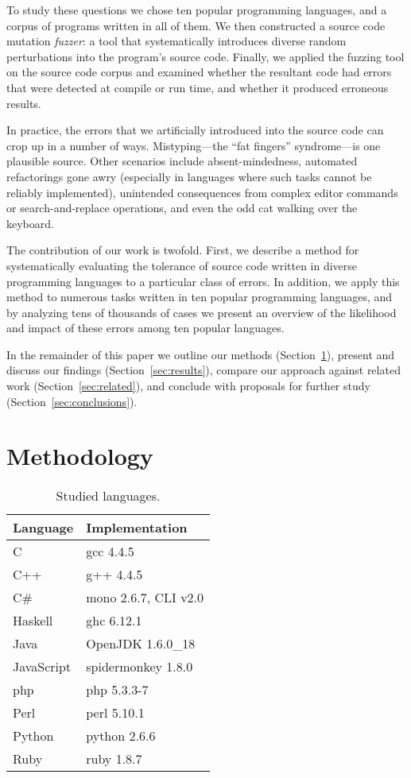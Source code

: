 \documentclass[10pt]{sigplanconf}
\begin{document}
To study these questions we chose ten popular programming languages,
and a corpus of programs written in all of them.
We then constructed a source code mutation {\em fuzzer}:
a tool that systematically introduces diverse random perturbations
into the program's source code.
Finally, we applied the fuzzing tool on the source code corpus
and examined whether the resultant code had errors that
were detected at compile or run time, and whether it produced
erroneous results.

In practice,
the errors that we artificially introduced into the source code can
crop up in a number of ways.
Mistyping---the ``fat fingers'' syndrome---is one plausible source.
Other scenarios include
absent-mindedness,
automated refactorings \cite{Fow00} gone awry
(especially in languages where such tasks cannot be reliably implemented),
unintended consequences from complex editor commands or
search-and-replace operations,
and even the odd cat walking over the keyboard.

The contribution of our work is twofold.
First, we describe a method for systematically evaluating the tolerance
of source code written in diverse programming languages to a particular
class of errors.
In addition, we apply this method to numerous tasks written in ten popular
programming languages,
and by analyzing tens of thousands of cases we present an overview of
the likelihood and impact of these errors among ten popular languages.

In the remainder of this paper we
outline our methods (Section~\ref{sec:method}),
present and discuss our findings (Section~\ref{sec:results}),
compare our approach against related work (Section~\ref{sec:related}),
and conclude with proposals for further study (Section~\ref{sec:conclusions}).

\section{Methodology} %
\label{sec:method}

\begin{table}
\begin{center}
\begin{tabular}{ l l}
Language & Implementation \\
\hline
C 			& gcc 4.4.5 \\
C++ 		& g++ 4.4.5 \\
C\# 		& mono 2.6.7, CLI v2.0 \\
Haskell 	& ghc 6.12.1 \\
Java 		& OpenJDK 1.6.0\_18 \\
JavaScript 	& spidermonkey 1.8.0 \\
{\sc php} 		& {\sc php} 5.3.3-7 \\
Perl 		& perl 5.10.1 \\
Python 		& python 2.6.6 \\
Ruby 		& ruby 1.8.7 \\
\end{tabular}
\end{center}
\caption{Studied languages.}
\label{tab:langs}
\end{table}
\end{document}
